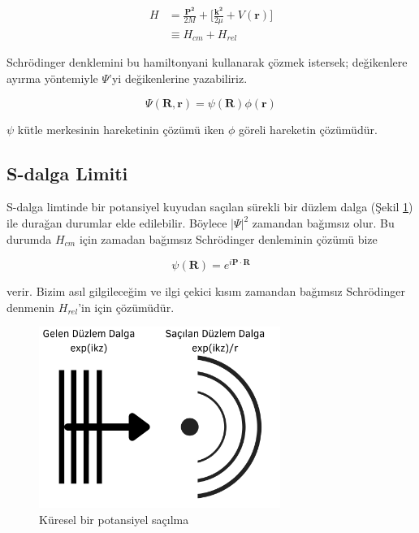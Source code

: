 \documentclass[12pt, a4paper]{article}
\newcommand{\vect}[1]{\mathbf{#1}}
\begin{document}
\begin{equation}\label{h2}
\begin{split}
H&=\frac{\vect{P^2}}{2M}+\Bigg[\frac{\vect{k^2}}{2\mu}+V(\vect{r})\Bigg]\\
&\equiv H_{cm}+H_{rel}
\end{split}
\end{equation}

Schrödinger denklemini bu hamiltonyani kullanarak çözmek istersek; değikenlere ayırma yöntemiyle  $\Psi$'yi değikenlerine yazabiliriz.

\begin{equation} \label{psi}
\Psi(\vect{R},\vect{r})=\psi(\vect{R})\phi(\vect{r})
\end{equation}

$\psi$ kütle merkesinin hareketinin çözümü iken $\phi$ göreli hareketin çözümüdür.

\subsection{S-dalga Limiti}

S-dalga limtinde bir potansiyel kuyudan saçılan sürekli bir düzlem dalga (Şekil \ref{fig:swave}) ile durağan durumlar elde edilebilir. Böylece $|\Psi|^2$ zamandan bağımsız olur. Bu durumda $H_{cm}$ için zamadan bağımsız Schrödinger denleminin çözümü bize

\begin{equation} \label{hcm}
\psi(\vect{R})=e^{i\vect{P}\cdot \vect{R}}
\end{equation}

verir. Bizim asıl gilgileceğim ve ilgi çekici kısım zamandan bağımsız Schrödinger denmenin $H_{rel}$'in için çözümüdür. 

\begin{figure}[h!]
 	\centering
	\shorthandoff{=}
      \includegraphics[width=0.7\textwidth]{s-wave.png}
	\caption{\label{fig:swave}Küresel bir potansiyel saçılma}
\end{figure}
\end{document}
